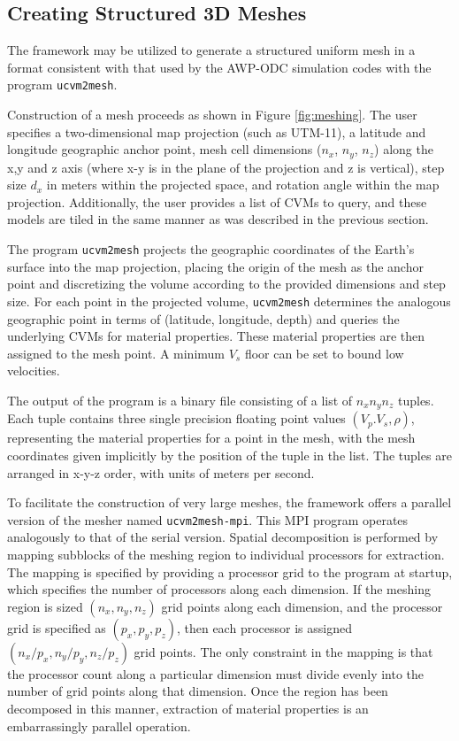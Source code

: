

\subsection{Creating Structured 3D Meshes}

The framework may be utilized to generate a structured uniform mesh in a format consistent with that used by the AWP-ODC simulation codes with the program \texttt{ucvm2mesh}.

Construction of a mesh proceeds as shown in Figure \ref{fig:meshing}. The user specifies a two-dimensional map projection (such as UTM-11), a latitude and longitude geographic anchor point, mesh cell dimensions ($n_x$, $n_y$, $n_z$) along the x,y and z axis (where x-y is in the plane of the projection and z is vertical), step size $d_x$ in meters within the projected space, and rotation angle within the map projection. Additionally, the user provides a list of CVMs to query, and these models are tiled in the same manner as was described in the previous section.

The program \texttt{ucvm2mesh} projects the geographic coordinates of the Earth's surface into the map projection, placing the origin of the mesh as the anchor point and discretizing the volume according to the provided dimensions and step size. For each point in the projected volume, \texttt{ucvm2mesh} determines the analogous geographic point in terms of (latitude, longitude, depth) and queries the underlying CVMs for material properties. These material properties are then assigned to the mesh point. A minimum $V_s$ floor can be set to bound low velocities.

The output of the program is a binary file consisting of a list of $n_xn_yn_z$ tuples. Each tuple contains three single precision floating point values $(V_p. V_s, \rho)$, representing the material properties for a point in the mesh, with the mesh coordinates given implicitly by the position of the tuple in the list. The tuples are arranged in x-y-z order, with units of meters per second. 

To facilitate the construction of very large meshes, the framework offers a parallel version of the mesher named \texttt{ucvm2mesh-mpi}. This MPI program operates analogously to that of the serial version. Spatial decomposition is performed by mapping subblocks of the meshing region to individual processors for extraction. The mapping is specified by providing a processor grid to the program at startup, which specifies the number of processors along each dimension. If the meshing region is sized $(n_x, n_y, n_z)$ grid points along each dimension, and the processor grid is specified as $(p_x, p_y, p_z)$, then each processor is assigned $(n_x/p_x, n_y/p_y, n_z/p_z)$ grid points. The only constraint in the mapping is that the processor count along a particular dimension must divide evenly into the number of grid points along that dimension. Once the region has been decomposed in this manner, extraction of material properties is an embarrassingly parallel operation.  

